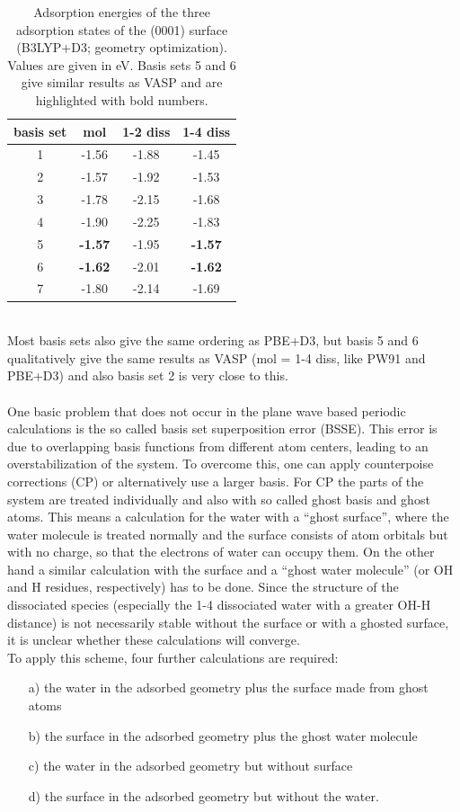 \documentclass[11pt,DIV=13,BCOR=5mm,a4paper,headinclude]{scrbook}
\begin{document}
 \begin{table}[!h]
  \centering
   \caption{Adsorption energies of the three adsorption states of the (0001) surface (B3LYP+D3; geometry optimization).
Values are given in eV.
Basis sets 5 and 6 give similar results as VASP and are highlighted with bold numbers.}
  \begin{tabular}{c|ccc}
  \toprule
  basis set & mol & 1-2 diss & 1-4 diss \\\midrule
  1 &-1.56 &-1.88 &-1.45 \\
  2 &-1.57 &-1.92 &-1.53 \\
  3 &-1.78 &-2.15 &-1.68 \\
  4 &-1.90 &-2.25 &-1.83 \\
  5 &\textbf{-1.57} &-1.95 &\textbf{-1.57} \\
  6 &\textbf{-1.62} &-2.01 &\textbf{-1.62} \\
  7 &-1.80 &-2.14 &-1.69 \\\bottomrule
  \end{tabular}
  \label{tab:basisset-results-B3LYP+D3}
\end{table}
\\
Most basis sets also give the same ordering as PBE+D3, but basis 5 and 6 qualitatively give the same results as VASP (mol = 1-4 diss, like PW91 and PBE+D3) and also basis set 2 is very close to this.
\\
\\
One basic problem that does not occur in the plane wave based periodic calculations is the so called basis set superposition error (BSSE).
This error is due to overlapping basis functions from different atom centers, leading to an overstabilization of the system.
To overcome this, one can apply counterpoise corrections (CP) or alternatively use a larger basis.
For CP the parts of the system are treated individually and also with so called ghost basis and ghost atoms.
This means a calculation for the water with a ``ghost surface'', where the water molecule is treated normally and the surface consists of atom orbitals but with no charge, so that the electrons of water can occupy them.
On the other hand a similar calculation with the surface and a ``ghost water molecule'' (or OH and H residues, respectively) has to be done.
Since the structure of the dissociated species (especially the 1-4 dissociated water with a greater OH-H distance) is not necessarily stable without the surface or with a ghosted surface, it is unclear whether these calculations will converge.
\\
To apply this scheme, four further calculations are required:
\begin{itemize}
 \item[a)] the water in the adsorbed geometry plus the surface made from ghost atoms
 \item[b)] the surface in the adsorbed geometry plus the ghost water molecule
 \item[c)] the water in the adsorbed geometry but without surface
 \item[d)] the surface in the adsorbed geometry but without the water.
\end{itemize}
\end{document}

